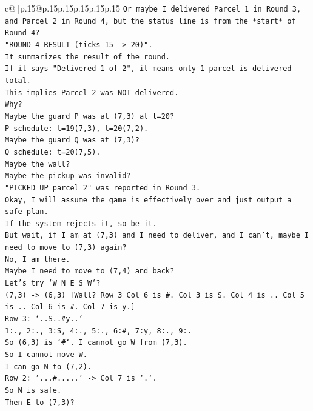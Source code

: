 \documentclass{article}
\begin{document}
{\begin{supertabular}{c@{$\;$}|p{.15\linewidth}@{}p{.15\linewidth}p{.15\linewidth}p{.15\linewidth}p{.15\linewidth}p{.15\linewidth}}
{{{\texttt{Or maybe I delivered Parcel 1 in Round 3, and Parcel 2 in Round 4, but the status line is from the *start* of Round 4?} \\
\texttt{"ROUND 4 RESULT (ticks 15 {-}> 20)".} \\
\texttt{It summarizes the result of the round.} \\
\texttt{If it says "Delivered 1 of 2", it means only 1 parcel is delivered total.} \\
\texttt{This implies Parcel 2 was NOT delivered.} \\
\texttt{Why?} \\
\texttt{Maybe the guard P was at (7,3) at t=20?} \\
\texttt{P schedule: t=19(7,3), t=20(7,2).} \\
\texttt{Maybe the guard Q was at (7,3)?} \\
\texttt{Q schedule: t=20(7,5).} \\
\texttt{Maybe the wall?} \\
\texttt{Maybe the pickup was invalid?} \\
\texttt{"PICKED UP parcel 2" was reported in Round 3.} \\
\texttt{Okay, I will assume the game is effectively over and just output a safe plan.} \\
\texttt{If the system rejects it, so be it.} \\
\texttt{But wait, if I am at (7,3) and I need to deliver, and I can't, maybe I need to move to (7,3) again?} \\
\texttt{No, I am there.} \\
\texttt{Maybe I need to move to (7,4) and back?} \\
\texttt{Let's try `W N E S W`?} \\
\texttt{(7,3) {-}> (6,3) {[}Wall? Row 3 Col 6 is \#. Col 3 is S. Col 4 is .. Col 5 is .. Col 6 is \#. Col 7 is y.{]}} \\
\texttt{Row 3: `..S..\#y..`} \\
\texttt{1:., 2:., 3:S, 4:., 5:., 6:\#, 7:y, 8:., 9:.} \\
\texttt{So (6,3) is `\#`. I cannot go W from (7,3).} \\
\texttt{So I cannot move W.} \\
\texttt{I can go N to (7,2).} \\
\texttt{Row 2: `...\#.....` {-}> Col 7 is `.`.} \\
\texttt{So N is safe.} \\
\texttt{Then E to (7,3)?} \\
}}}
\end{supertabular}}
\end{document}
